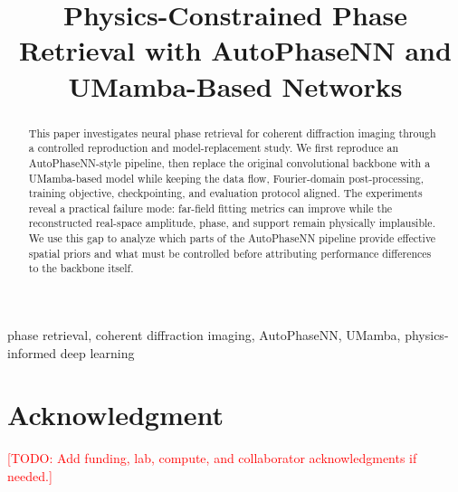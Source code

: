 \documentclass[conference]{IEEEtran}
\newcommand{\todo}[1]{\textcolor{red}{[TODO: #1]}}
\begin{document}
\title{Physics-Constrained Phase Retrieval with AutoPhaseNN and UMamba-Based Networks}

\author{
}

\maketitle

\begin{abstract}
This paper investigates neural phase retrieval for coherent diffraction imaging
through a controlled reproduction and model-replacement study. We first
reproduce an AutoPhaseNN-style pipeline, then replace the original convolutional
backbone with a UMamba-based model while keeping the data flow, Fourier-domain
post-processing, training objective, checkpointing, and evaluation protocol
aligned. The experiments reveal a practical failure mode: far-field fitting
metrics can improve while the reconstructed real-space amplitude, phase, and
support remain physically implausible. We use this gap to analyze which parts of
the AutoPhaseNN pipeline provide effective spatial priors and what must be
controlled before attributing performance differences to the backbone itself.
\end{abstract}

\begin{IEEEkeywords}
phase retrieval, coherent diffraction imaging, AutoPhaseNN, UMamba, physics-informed deep learning
\end{IEEEkeywords}









\section*{Acknowledgment}
\todo{Add funding, lab, compute, and collaborator acknowledgments if needed.}



\end{document}
